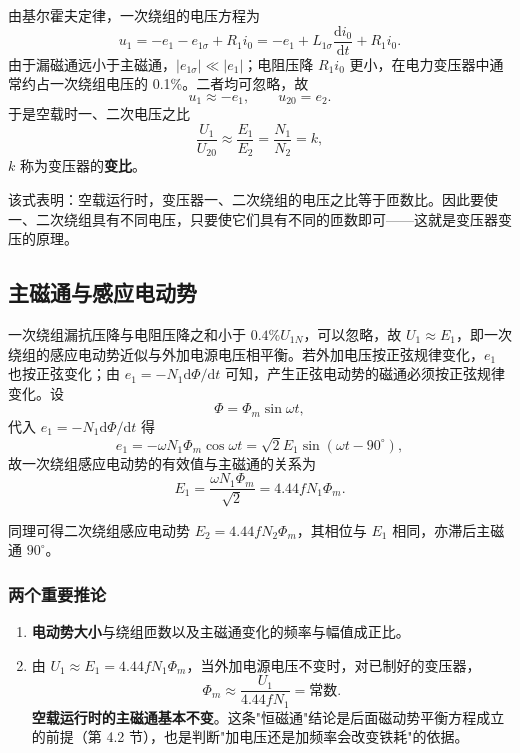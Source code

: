 由基尔霍夫定律，一次绕组的电压方程为
\begin{equation}
u_1=-e_1-e_{1\sigma}+R_1i_0=-e_1+L_{1\sigma}\frac{\mathrm{d}i_0}{\mathrm{d}t}+R_1i_0 .
\end{equation}
由于漏磁通远小于主磁通，$|e_{1\sigma}|\ll|e_1|$；电阻压降 $R_1i_0$ 更小，在电力变压器中通常约占一次绕组电压的 0.1\%。二者均可忽略，故
\begin{equation}
u_1\approx-e_1,\qquad u_{20}=e_2 .
\end{equation}
于是空载时一、二次电压之比
\begin{equation}
\frac{U_1}{U_{20}}\approx\frac{E_1}{E_2}=\frac{N_1}{N_2}=k ,
\end{equation}
$k$ 称为变压器的\textbf{变比}。


该式表明：空载运行时，变压器一、二次绕组的电压之比等于匝数比。因此要使一、二次绕组具有不同电压，只要使它们具有不同的匝数即可——这就是变压器变压的原理。

\subsection{主磁通与感应电动势}
一次绕组漏抗压降与电阻压降之和小于 $0.4\%U_{1N}$，可以忽略，故 $U_1\approx E_1$，即一次绕组的感应电动势近似与外加电源电压相平衡。若外加电压按正弦规律变化，$e_1$ 也按正弦变化；由 $e_1=-N_1\mathrm{d}\Phi/\mathrm{d}t$ 可知，产生正弦电动势的磁通必须按正弦规律变化。设
\begin{equation}
\Phi=\Phi_m\sin\omega t,
\end{equation}
代入 $e_1=-N_1\mathrm{d}\Phi/\mathrm{d}t$ 得
\begin{equation}
e_1=-\omega N_1\Phi_m\cos\omega t=\sqrt2E_1\sin\!\left(\omega t-90^\circ\right),
\end{equation}
故一次绕组感应电动势的有效值与主磁通的关系为
\begin{equation}
E_1=\frac{\omega N_1\Phi_m}{\sqrt2}=4.44fN_1\Phi_m .
\end{equation}


同理可得二次绕组感应电动势 $E_2=4.44fN_2\Phi_m$，其相位与 $E_1$ 相同，亦滞后主磁通 $90^\circ$。

\subsubsection{两个重要推论}
\begin{enumerate}
  \item \textbf{电动势大小}与绕组匝数以及主磁通变化的频率与幅值成正比。
  \item 由 $U_1\approx E_1=4.44fN_1\Phi_m$，当外加电源电压不变时，对已制好的变压器，
  \begin{equation}
  \Phi_m\approx\frac{U_1}{4.44fN_1}=\text{常数}.
  \end{equation}
  \textbf{空载运行时的主磁通基本不变}。这条"恒磁通"结论是后面磁动势平衡方程成立的前提（第 4.2 节），也是判断"加电压还是加频率会改变铁耗"的依据。
\end{enumerate}

